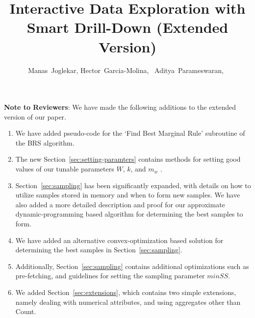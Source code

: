 \documentclass[10pt,journal,compsoc]{IEEEtran}
\begin{document}
\textbf{Note to Reviewers}: We have made the following additions to the extended version of our paper.

\begin{enumerate}
\item We have added pseudo-code for the `Find Best Marginal Rule' subroutine of the BRS algorithm.
\item The new Section~\ref{sec:setting-paramters} contains methods for setting good values of our tunable parameters $W$, $k$, and $m_w$ .
\item Section~\ref{sec:sampling} has been significantly expanded, with details on how to utilize samples stored in memory and when to form new samples. We have also added a more detailed description and proof for our approximate dynamic-programming based algorithm for determining the best samples to form.
\item We have added an alternative convex-optimization based solution for determining the best samples in Section~\ref{sec:sampling}.
\item Additionally, Section~\ref{sec:sampling} contains additional optimizations such as pre-fetching, and guidelines for setting the sampling parameter $minSS$. 
\item We added Section~\ref{sec:extensions}, which contains two simple extensions, namely dealing with numerical attributes, and using aggregates other than Count. 
\end{enumerate}

\newpage


\title{Interactive Data Exploration with Smart Drill-Down (Extended Version)}

\author{Manas~Joglekar,
        Hector~Garcia-Molina,~
        Aditya~Parameswaran,~
}%
\end{document}
